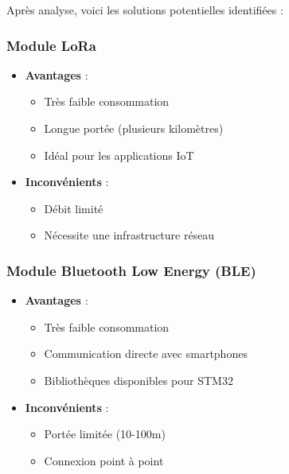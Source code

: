 \documentclass[12pt]{article}
\begin{document}
Après analyse, voici les solutions potentielles identifiées :

\subsubsection{Module LoRa}
\begin{itemize}
    \item \textbf{Avantages} :
    \begin{itemize}
        \item Très faible consommation
        \item Longue portée (plusieurs kilomètres)
        \item Idéal pour les applications IoT
    \end{itemize}
    \item \textbf{Inconvénients} :
    \begin{itemize}
        \item Débit limité
        \item Nécessite une infrastructure réseau
    \end{itemize}
\end{itemize}

\subsubsection{Module Bluetooth Low Energy (BLE)}
\begin{itemize}
    \item \textbf{Avantages} :
    \begin{itemize}
        \item Très faible consommation
        \item Communication directe avec smartphones
        \item Bibliothèques disponibles pour STM32
    \end{itemize}
    \item \textbf{Inconvénients} :
    \begin{itemize}
        \item Portée limitée (10-100m)
        \item Connexion point à point
    \end{itemize}
\end{itemize}
\end{document}
